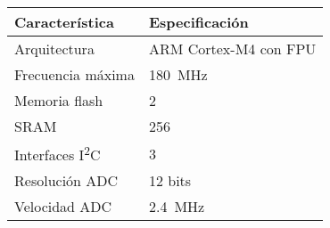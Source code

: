 	\begin{tabular}{ll}
		\toprule
		\textbf{Característica} & \textbf{Especificación} \\
		\midrule
		Arquitectura & ARM Cortex-M4 con FPU \\
		Frecuencia máxima & \SI{180}{\mega\hertz} \\
		Memoria flash & \SI{2}{\mega\byte} \\
		SRAM & \SI{256}{\kilo\byte} \\
		Interfaces I\textsuperscript{2}C & 3 \\
		Resolución ADC & 12 bits \\
		Velocidad ADC & \SI{2.4}{\mega\hertz} \\
		\bottomrule
	\end{tabular}